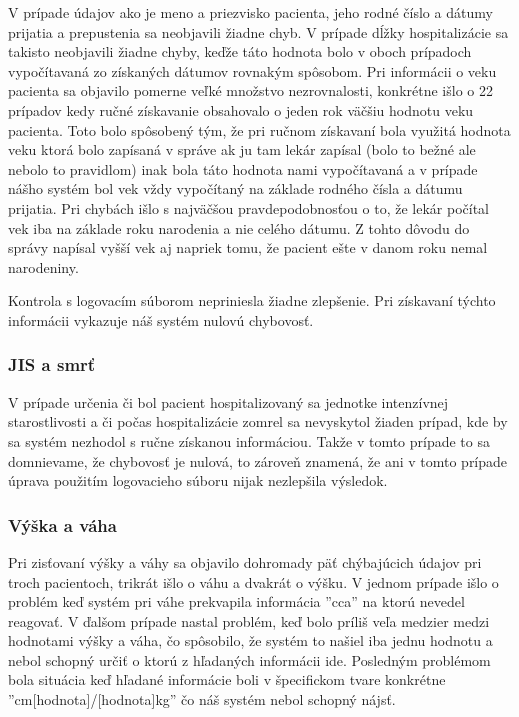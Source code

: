 V prípade údajov ako je meno a priezvisko pacienta, jeho rodné číslo a dátumy prijatia a prepustenia sa neobjavili žiadne chyb. V prípade dĺžky hospitalizácie sa takisto neobjavili žiadne chyby, keďže táto hodnota bolo v oboch prípadoch vypočítavaná zo získaných dátumov rovnakým spôsobom. Pri informácii o veku pacienta sa objavilo pomerne veľké množstvo nezrovnalosti, konkrétne išlo o 22 prípadov kedy ručné získavanie obsahovalo o jeden rok väčšiu hodnotu veku pacienta. Toto bolo spôsobený tým, že pri ručnom získavaní bola využitá hodnota veku ktorá bolo zapísaná v správe ak ju tam lekár zapísal (bolo to bežné ale nebolo to pravidlom) inak bola táto hodnota nami vypočítavaná a v prípade nášho systém bol vek vždy vypočítaný na základe rodného čísla a dátumu prijatia. Pri chybách išlo s najväčšou pravdepodobnosťou o to, že lekár  počítal vek iba na základe roku narodenia a nie celého dátumu. Z tohto dôvodu do správy napísal vyšší vek aj napriek tomu, že pacient ešte v danom roku nemal narodeniny.

Kontrola s logovacím súborom nepriniesla žiadne zlepšenie. Pri získavaní týchto informácii vykazuje náš systém nulovú chybovosť.

\subsubsection{JIS a smrť}

V prípade určenia či bol pacient hospitalizovaný sa jednotke intenzívnej starostlivosti a či počas hospitalizácie zomrel sa nevyskytol žiaden prípad, kde by sa systém nezhodol s ručne získanou informáciou. Takže v tomto prípade to sa domnievame, že chybovosť je nulová, to zároveň znamená, že ani v tomto prípade úprava použitím logovacieho súboru nijak nezlepšila výsledok. 

\subsubsection{Výška a váha}

Pri zisťovaní výšky a váhy sa objavilo dohromady päť chýbajúcich údajov pri troch pacientoch, trikrát išlo o váhu a dvakrát o výšku. V jednom prípade išlo o problém keď systém pri váhe prekvapila informácia ''cca'' na ktorú nevedel reagovať. V ďalšom prípade nastal problém, keď bolo príliš veľa medzier medzi hodnotami výšky a váha, čo spôsobilo, že systém to našiel iba jednu hodnotu a nebol schopný určiť o ktorú z hľadaných informácii ide. Posledným problémom bola situácia keď hľadané informácie boli v špecifickom tvare konkrétne ''cm[hodnota]/[hodnota]kg'' čo náš systém nebol schopný nájsť.

